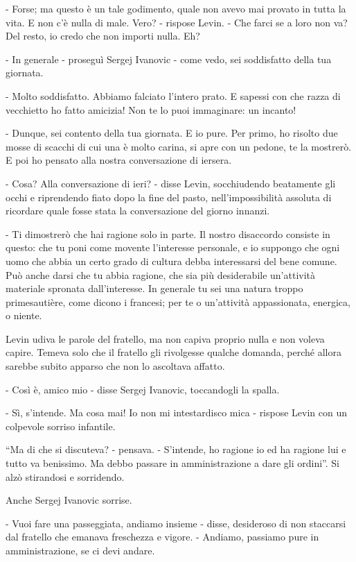 - Forse; ma questo è un tale godimento, quale non avevo mai provato in tutta la vita. E non c'è nulla di male. Vero? - rispose Levin. - Che farci se a loro non va? Del resto, io credo che non importi nulla. Eh? 

- In generale - proseguì Sergej Ivanovic - come vedo, sei soddisfatto della tua giornata. 

- Molto soddisfatto. Abbiamo falciato l'intero prato. E sapessi con che razza di vecchietto ho fatto amicizia! Non te lo puoi immaginare: un incanto! 

- Dunque, sei contento della tua giornata. E io pure. Per primo, ho risolto due mosse di scacchi di cui una è molto carina, si apre con un pedone, te la mostrerò. E poi ho pensato alla nostra conversazione di iersera. 

- Cosa? Alla conversazione di ieri? - disse Levin, socchiudendo beatamente gli occhi e riprendendo fiato dopo la fine del pasto, nell'impossibilità assoluta di ricordare quale fosse stata la conversazione del giorno innanzi. 

- Ti dimostrerò che hai ragione solo in parte. Il nostro disaccordo consiste in questo: che tu poni come movente l'interesse personale, e io suppongo che ogni uomo che abbia un certo grado di cultura debba interessarsi del bene comune. Può anche darsi che tu abbia ragione, che sia più desiderabile un'attività materiale spronata dall'interesse. In generale tu sei una natura troppo primesautière, come dicono i francesi; per te o un'attività appassionata, energica, o niente. 

Levin udiva le parole del fratello, ma non capiva proprio nulla e non voleva capire. Temeva solo che il fratello gli rivolgesse qualche domanda, perché allora sarebbe subito apparso che non lo ascoltava affatto. 

- Così è, amico mio - disse Sergej Ivanovic, toccandogli la spalla. 

- Sì, s'intende. Ma cosa mai! Io non mi intestardisco mica - rispose Levin con un colpevole sorriso infantile. 

``Ma di che si discuteva? - pensava. - S'intende, ho ragione io ed ha ragione lui e tutto va benissimo. Ma debbo passare in amministrazione a dare gli ordini''. Si alzò stirandosi e sorridendo. 

Anche Sergej Ivanovic sorrise. 

- Vuoi fare una passeggiata, andiamo insieme - disse, desideroso di non staccarsi dal fratello che emanava freschezza e vigore. - Andiamo, passiamo pure in amministrazione, se ci devi andare. 

